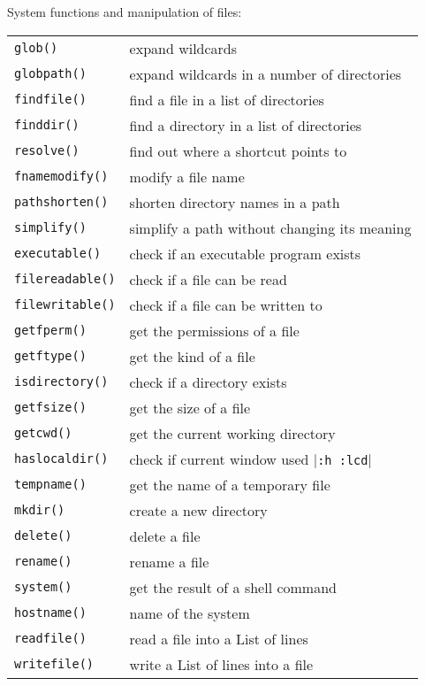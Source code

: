 System functions and manipulation of files:
\label{system-functions}
\label{file-functions}
\begin{center} \begin{tabular}{l l}
				\texttt{glob()} & expand wildcards \\
				\texttt{globpath()} & expand wildcards in a number of directories \\
				\texttt{findfile()} & find a file in a list of directories \\
				\texttt{finddir()} & find a directory in a list of directories \\
				\texttt{resolve()} & find out where a shortcut points to \\
				\texttt{fnamemodify()} & modify a file name \\
				\texttt{pathshorten()} & shorten directory names in a path \\
				\texttt{simplify()} & simplify a path without changing its meaning \\
				\texttt{executable()} & check if an executable program exists \\
				\texttt{filereadable()} & check if a file can be read \\
				\texttt{filewritable()} & check if a file can be written to \\
				\texttt{getfperm()} & get the permissions of a file \\
				\texttt{getftype()} & get the kind of a file \\
				\texttt{isdirectory()} & check if a directory exists \\
				\texttt{getfsize()} & get the size of a file \\
				\texttt{getcwd()} & get the current working directory \\
				\texttt{haslocaldir()} & check if current window used |\texttt{:h :lcd}| \\
				\texttt{tempname()} & get the name of a temporary file \\
				\texttt{mkdir()} & create a new directory \\
				\texttt{delete()} & delete a file \\
				\texttt{rename()} & rename a file \\
				\texttt{system()} & get the result of a shell command \\
				\texttt{hostname()} & name of the system \\
				\texttt{readfile()} & read a file into a List of lines \\
				\texttt{writefile()} & write a List of lines into a file \\
\end{tabular} \end{center}

